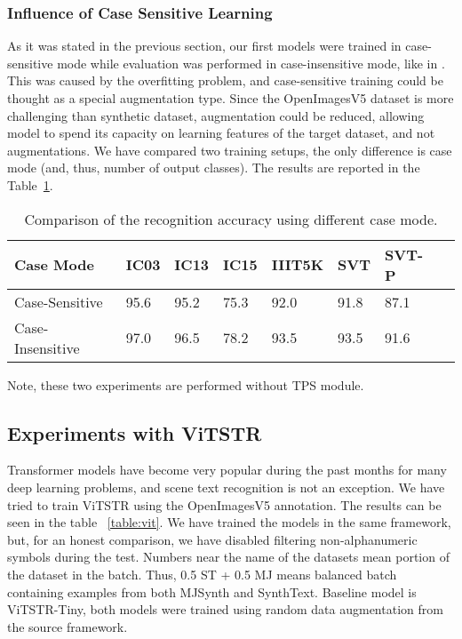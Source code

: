 \documentclass[runningheads]{llncs}
\begin{document}
\subsubsection{Influence of Case Sensitive Learning}

As it was stated in the previous section, our first models were trained in case-sensitive
mode while evaluation was performed in case-insensitive mode, like in \cite{lee2020satrn}.
This was caused by the overfitting problem, and case-sensitive training could be thought as a
special augmentation type. Since the OpenImagesV5 dataset is more challenging than
synthetic dataset, augmentation could be reduced, allowing model to spend its capacity
on learning features of the target dataset, and not augmentations. We have compared
two training setups, the only difference is case mode (and, thus, number of output
classes). The results are reported in the Table~\ref{table:case_mode}.

\begin{table}[ht]
  \centering
  \caption{Comparison of the recognition accuracy using different case mode.}
  \begin{tabular}{|l|l|l|l|l|l|l|l|}
    \hline
    Case Mode        & IC03 & IC13 & IC15 & IIIT5K & SVT  & SVT-P \\
    \hline
    Case-Sensitive   & 95.6 & 95.2 & 75.3 & 92.0   & 91.8 & 87.1  \\
    Case-Insensitive & 97.0 & 96.5 & 78.2 & 93.5   & 93.5 & 91.6  \\
    \hline
  \end{tabular}

  \label{table:case_mode}
\end{table}

Note, these two experiments are performed without TPS module.

\subsection{Experiments with ViTSTR}

Transformer models have become very popular during the past months for many deep learning
problems, and scene text recognition is not an exception. We have tried to train ViTSTR
\cite{vitstr} using the OpenImagesV5 annotation. The results can be seen in the table~
\ref{table:vit}. We have trained the models in the same framework, but, for an honest comparison,
we have disabled filtering non-alphanumeric symbols during the test. Numbers near the name of the
datasets mean portion of the dataset in the batch. Thus, 0.5 ST + 0.5 MJ means balanced batch
containing examples from both MJSynth and SynthText. Baseline model is ViTSTR-Tiny, both models
were trained using random data augmentation from the source framework.
\end{document}
